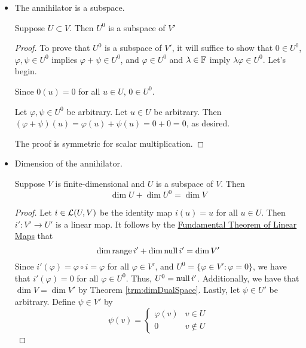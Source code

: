 \documentclass[../main.tex]{subfiles}
\begin{document}
\begin{itemize}
    \item The annihilator is a subspace.
    \begin{theorem}
        Suppose $U\subset V$. Then $U^0$ is a subspace of $V'$
        \begin{proof}
            To prove that $U^0$ is a subspace of $V'$, it will suffice to show that $0\in U^0$, $\varphi,\psi\in U^0$ implies $\varphi+\psi\in U^0$, and $\varphi\in U^0$ and $\lambda\in\mathbb{F}$ imply $\lambda\varphi\in U^0$. Let's begin.\par
            Since $0(u)=0$ for all $u\in U$, $0\in U^0$.\par
            Let $\varphi,\psi\in U^0$ be arbitrary. Let $u\in U$ be arbitrary. Then $(\varphi+\psi)(u)=\varphi(u)+\psi(u)=0+0=0$, as desired.\par
            The proof is symmetric for scalar multiplication.
        \end{proof}
    \end{theorem}
    \item Dimension of the annihilator.
    \begin{theorem}\label{trm:dimAnnihilator}
        Suppose $V$ is finite-dimensional and $U$ is a subspace of $V$. Then
        \begin{equation*}
            \dim U+\dim U^0 = \dim V
        \end{equation*}
        \begin{proof}
            Let $i\in\mathcal{L}(U,V)$ be the identity map $i(u)=u$ for all $u\in U$. Then $i':V'\to U'$ is a linear map. It follows by the \hyperref[trm:fundamentalTheoremLinearMaps]{Fundamental Theorem of Linear Maps} that
            \begin{equation*}
                \dim\operatorname{range} i'+\dim\operatorname{null} i' = \dim V'
            \end{equation*}
            Since $i'(\varphi)=\varphi\circ i=\varphi$ for all $\varphi\in V'$, and $U^0=\{\varphi\in V':\varphi=0\}$, we have that $i'(\varphi)=0$ for all $\varphi\in U^0$. Thus, $U^0=\operatorname{null} i'$. Additionally, we have that $\dim V=\dim V'$ by Theorem \ref{trm:dimDualSpace}. Lastly, let $\psi\in U'$ be arbitrary. Define $\psi\in V'$ by
            \begin{equation*}
                \psi(v) =
                \begin{cases}
                    \varphi(v) & v\in U\\
                    0 & v\notin U
                \end{cases}
            \end{equation*}

\end{proof}
\end{theorem}
\end{itemize}
\end{document}
